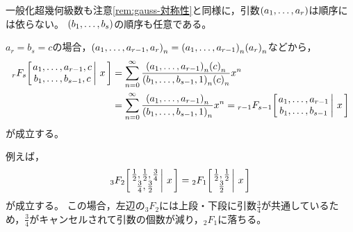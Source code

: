 \documentclass[a4paper,draft]{ltjsarticle}
\begin{document}
\begin{rem}
    一般化超幾何級数も注意\ref{rem:gauss-対称性}と同様に，引数$\pare{a_1,\dots,a_r}$は順序には依らない。
    $\pare{b_1,\dots,b_s}$の順序も任意である。
\end{rem}

\begin{supple}
    $a_r=b_s=c$の場合，$\poch{a_1,\dots,a_{r-1},a_r}{n}=\poch{a_1,\dots,a_{r-1}}{n}\poch{a_r}{n}$などから，
    \begin{align}
        \pfq{r}{s}{a_1,\dots,a_{r-1},c}{b_1,\dots,b_{s-1},c}{x}
        &= \sum_{n=0}^\infty \dfrac{\poch{a_1,\dots,a_{r-1}}{n}\poch{c}{n}}{\poch{b_1,\dots,b_{s-1},1}{n}\poch{c}{n}}x^n
        \\
        &=\sum_{n=0}^\infty \dfrac{\poch{a_1,\dots,a_{r-1}}{n}}{\poch{b_1,\dots,b_{s-1},1}{n}}x^n=\pfq{r-1}{s-1}{a_1,\dots,a_{r-1}}{b_1,\dots,b_{s-1}}{x}
    \end{align}
    が成立する。

    例えば，
    \begin{equation}
        \pfq{3}{2}{\frac{1}{2},\frac{1}{2},\frac{3}{4}}{\frac{3}{4},\frac{3}{2}}{x}=\Gauss{\frac{1}{2}}{\frac{1}{2}}{\frac{3}{2}}{x}
    \end{equation}
    が成立する。
    この場合，左辺の${}_3F_2$には上段・下段に引数$\frac{3}{4}$が共通しているため，$\frac{3}{4}$がキャンセルされて引数の個数が減り，${}_2F_1$に落ちる。
\end{supple}
\end{document}

